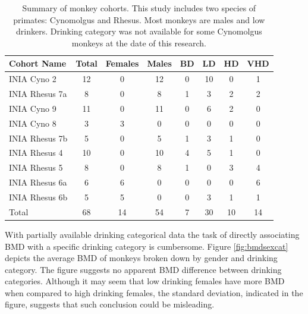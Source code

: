 \documentclass{bmcart}
\begin{document}
\begin{table}[t]
\caption{Summary of monkey cohorts. This study includes two species 
of primates: Cynomolgus and Rhesus. Most monkeys are males and low drinkers. 
Drinking category was not available for some Cynomolgus monkeys at the date of
this research.}
\label{tbl:cohorts}
      \begin{tabular}{lccccccc}
        \hline
   Cohort Name &  Total &  Females &  Males &  BD &  LD &  HD &  VHD \\ \hline
   INIA Cyno 2 &     12 &        0 &     12 &   0 &  10 &   0 &    1 \\
INIA Rhesus 7a &      8 &        0 &      8 &   1 &   3 &   2 &    2 \\
   INIA Cyno 9 &     11 &        0 &     11 &   0 &   6 &   2 &    0 \\
   INIA Cyno 8 &      3 &        3 &      0 &   0 &   0 &   0 &    0 \\
INIA Rhesus 7b &      5 &        0 &      5 &   1 &   3 &   1 &    0 \\
 INIA Rhesus 4 &     10 &        0 &     10 &   4 &   5 &   1 &    0 \\
 INIA Rhesus 5 &      8 &        0 &      8 &   1 &   0 &   3 &    4 \\
INIA Rhesus 6a &      6 &        6 &      0 &   0 &   0 &   0 &    6 \\
INIA Rhesus 6b &      5 &        5 &      0 &   0 &   3 &   1 &    1 \\ \hline
         Total &     68 &       14 &     54 &   7 &  30 &  10 &   14 \\ \hline
      \end{tabular}
\end{table}

With partially available drinking categorical data the task of directly
associating BMD with a specific drinking category is cumbersome. Figure
\ref{fig:bmdsexcat} depicts the average BMD of monkeys broken down by gender
and drinking category. The figure suggests no apparent BMD difference between
drinking categories. Although it may seem that low drinking females have more
BMD when compared to high drinking females, the standard deviation, indicated
in the figure, suggests that such conclusion could be misleading.
\end{document}
